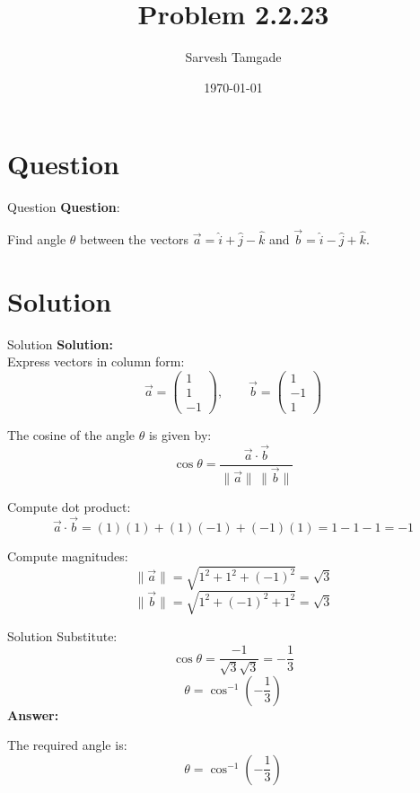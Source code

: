 \documentclass{beamer}
\title{Problem 2.2.23}
\author{Sarvesh Tamgade}
\date{\today}
\theoremstyle{remark}
\newcommand{\myvec}[1]{\ensuremath{\begin{pmatrix}#1\end{pmatrix}}}
\numberwithin{equation}{section}
\begin{document}
\begin{frame}
\titlepage
\end{frame}


\section{Question}
\begin{frame}{Question}
\textbf{Question}:


\noindent Find angle \(\theta\) between the vectors \(\vec{a} = \hat{i} + \hat{j} - \hat{k}\) and \(\vec{b} = \hat{i} - \hat{j} + \hat{k}\).
   

\end{frame}

    

\section{Solution}
\begin{frame}{Solution}
\textbf{Solution:} 
\\
Express vectors in column form:
\[
\vec{a} = \myvec{1 \\ 1 \\ -1},
\qquad
\vec{b} = \myvec{1 \\ -1 \\ 1}
\]

The cosine of the angle \(\theta\) is given by:
\[
\cos\theta = \frac{\vec{a} \cdot \vec{b}}{\|\vec{a}\| \, \|\vec{b}\|}
\]

Compute dot product:
\[
\vec{a} \cdot \vec{b} = (1)(1) + (1)(-1) + (-1)(1) = 1 - 1 - 1 = -1
\]

Compute magnitudes:
\[
\|\vec{a}\| = \sqrt{1^2 + 1^2 + (-1)^2} = \sqrt{3}
\]
\[
\|\vec{b}\| = \sqrt{1^2 + (-1)^2 + 1^2} = \sqrt{3}
\]


\end{frame}
\begin{frame}{Solution}
    Substitute:
\[
\cos\theta = \frac{-1}{\sqrt{3}\sqrt{3}} = -\frac{1}{3}
\]
\[
\theta = \cos^{-1}\left(-\frac{1}{3}\right)
\]
\vspace{2mm}
\textbf{Answer:}

The required angle is:
\[
\boxed{\theta = \cos^{-1}\left(-\frac{1}{3}\right)}
\]
\end{frame}
\end{document}
